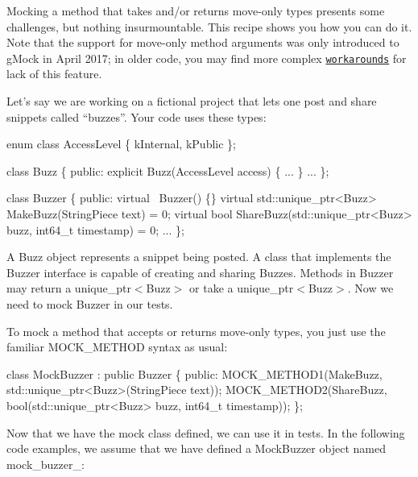 Mocking a method that takes and/or returns move-\/only types presents some challenges, but nothing insurmountable. This recipe shows you how you can do it. Note that the support for move-\/only method arguments was only introduced to g\+Mock in April 2017; in older code, you may find more complex \href{#legacy-workarounds-for-move-only-types}{\tt workarounds} for lack of this feature.

Let’s say we are working on a fictional project that lets one post and share snippets called “buzzes”. Your code uses these types\+:


\begin{DoxyCode}
\textcolor{keyword}{enum class} AccessLevel \{ kInternal, kPublic \};

\textcolor{keyword}{class }Buzz \{
 \textcolor{keyword}{public}:
  \textcolor{keyword}{explicit} Buzz(AccessLevel access) \{ ... \}
  ...
\};

\textcolor{keyword}{class }Buzzer \{
 \textcolor{keyword}{public}:
  \textcolor{keyword}{virtual} ~Buzzer() \{\}
  \textcolor{keyword}{virtual} std::unique\_ptr<Buzz> MakeBuzz(StringPiece text) = 0;
  \textcolor{keyword}{virtual} \textcolor{keywordtype}{bool} ShareBuzz(std::unique\_ptr<Buzz> buzz, int64\_t timestamp) = 0;
  ...
\};
\end{DoxyCode}


A {\ttfamily Buzz} object represents a snippet being posted. A class that implements the {\ttfamily Buzzer} interface is capable of creating and sharing {\ttfamily Buzz}es. Methods in {\ttfamily Buzzer} may return a {\ttfamily unique\+\_\+ptr$<$Buzz$>$} or take a {\ttfamily unique\+\_\+ptr$<$Buzz$>$}. Now we need to mock {\ttfamily Buzzer} in our tests.

To mock a method that accepts or returns move-\/only types, you just use the familiar {\ttfamily M\+O\+C\+K\+\_\+\+M\+E\+T\+H\+OD} syntax as usual\+:


\begin{DoxyCode}
\textcolor{keyword}{class }MockBuzzer : \textcolor{keyword}{public} Buzzer \{
 \textcolor{keyword}{public}:
  MOCK\_METHOD1(MakeBuzz, std::unique\_ptr<Buzz>(StringPiece text));
  MOCK\_METHOD2(ShareBuzz, \textcolor{keywordtype}{bool}(std::unique\_ptr<Buzz> buzz, int64\_t timestamp));
\};
\end{DoxyCode}


Now that we have the mock class defined, we can use it in tests. In the following code examples, we assume that we have defined a {\ttfamily Mock\+Buzzer} object named {\ttfamily mock\+\_\+buzzer\+\_\+}\+:


